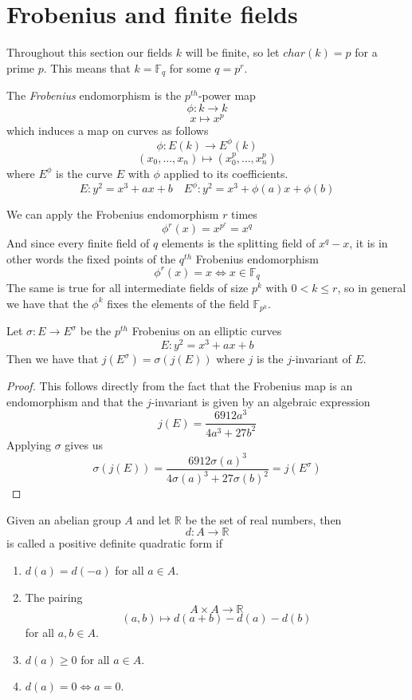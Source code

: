 \section{Frobenius and finite fields} \label{frob}
Throughout this section our fields $k$ will be finite, so let $char(k) = p$ for
a prime $p$. This means that $k = \mathbb{F}_{q}$ for some $q = p^r$.

\begin{mydef}
 The \emph{Frobenius} endomorphism is the $p^{th}$-power map
$$ \phi: k \rightarrow k $$
$$ x \mapsto x^p $$
which induces a map on curves as follows
$$ \phi: E(k) \rightarrow E^{\phi}(k) $$
$$ (x_0,\ldots , x_n) \mapsto (x_0^p, \ldots , x_n^p) $$
where $E^{\phi}$ is the curve $E$ with $\phi$ applied to its coefficients.
$$E: y^2 = x^3 + ax + b \quad E^{\phi}: y^2 = x^3 + \phi(a)x + \phi(b) $$
\end{mydef}

We can apply the Frobenius endomorphism $r$ times $$\phi^r(x) = x^{p^r} = x^q$$
And since every finite field of $q$ elements is the splitting field of $x^{q}-x$, it is in other words
the fixed points of the $q^{th}$ Frobenius endomorphism
$$ \phi^r(x) = x \iff x \in \mathbb{F}_q $$
The same is true for all intermediate fields of size $p^k$ with $0 < k \leq r$, so in general
we have that the $\phi^k$ fixes the elements of the field $\mathbb{F}_{p^k}$.

\begin{prop}
 Let $\sigma: E \rightarrow E^\sigma$ be the $p^{th}$ Frobenius on an elliptic curves
  $$ E: y^2 = x^3 + ax + b$$
Then we have that $j(E^\sigma) = \sigma(j(E))$ where $j$ is the $j$-invariant of $E$.
\end{prop}
\begin{proof}
 This follows directly from the fact that the Frobenius map is an endomorphism and that
the $j$-invariant is given by an algebraic expression \cite{AEC}
$$j(E) = \frac{6912 a^3}{4a^3 + 27b^2}$$ 
Applying $\sigma$ gives us
$$\sigma(j(E)) = \frac{6912 \sigma(a)^3}{4\sigma(a)^3 + 27 \sigma(b)^2} = j(E^\sigma)$$
\end{proof}

\begin{mydef}
 Given an abelian group $A$ and let $\mathbb{R}$ be the set of real numbers, then
$$d: A \rightarrow \mathbb{R}$$
is called a positive definite quadratic form if
\begin{enumerate}
 \item $d(a) = d(-a)$ for all $a\in A$.
 \item The pairing $$A\times A\rightarrow \mathbb{R}$$
		   $$ (a,b) \mapsto d(a+b)-d(a)-d(b) $$ for all $a,b\in A$.
 \item $d(a) \geq 0$ for all $a\in A$.
 \item $d(a) = 0 \iff a=0$.
\end{enumerate}
\end{mydef}

